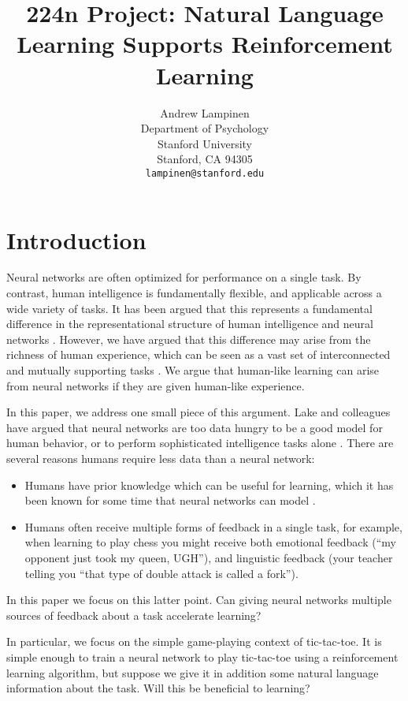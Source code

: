 \documentclass{article} %
\title{224n Project: Natural Language Learning Supports Reinforcement Learning}
\author{
Andrew Lampinen \\
Department of Psychology\\
Stanford University\\
Stanford, CA 94305 \\
\texttt{lampinen@stanford.edu} \\
}
\begin{document}
\maketitle

\begin{abstract}
\end{abstract}


\section{Introduction}
Neural networks are often optimized for performance on a single task. By contrast, human intelligence is fundamentally flexible, and applicable across a wide variety of tasks. It has been argued that this represents a fundamental difference in the representational structure of human intelligence and neural networks \cite{Lake2016}. However, we have argued that this difference may arise from the richness of human experience, which can be seen as a vast set of interconnected and mutually supporting tasks \cite{HansenInPress}. We argue that human-like learning can arise from neural networks if they are given human-like experience. \par
In this paper, we address one small piece of this argument. Lake and colleagues have argued that neural networks are too data hungry to be a good model for human behavior, or to perform sophisticated intelligence tasks alone \cite{Lake2016}. There are several reasons humans require less data than a neural network:
\begin{itemize}
\item Humans have prior knowledge which can be useful for learning, which it has been known for some time that neural networks can model \cite[e.g.]{Dienes1999}.
\item Humans often receive multiple forms of feedback in a single task, for example, when learning to play chess you might receive both emotional feedback (``my opponent just took my queen, UGH''), and linguistic feedback (your teacher telling you ``that type of double attack is called a fork'').
\end{itemize} 
In this paper we focus on this latter point. Can giving neural networks multiple sources of feedback about a task accelerate learning?\par
In particular, we focus on the simple game-playing context of tic-tac-toe. It is simple enough to train a neural network to play tic-tac-toe using a reinforcement learning algorithm, but suppose we give it in addition some natural language information about the task. Will this be beneficial to learning? 
\end{document}
